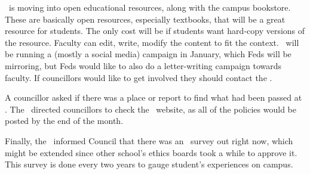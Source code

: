 \begin{information}
    \ousa\ is moving into open educational resources, along with the campus 
    bookstore. These are basically open resources, especially textbooks, that
    will be a great resource for students. The  only cost will be if students
    want hard-copy versions of the resource. Faculty can edit, write, modify 
    the content to fit the context. \ousa\ will be running a (mostly a social 
    media) campaign in January, which Feds will be mirroring, but Feds would 
    like to also do a letter-writing campaign towards faculty. If councillors
    would like to get involved they should contact the \vpe.

    A councillor asked if there was a place or report to find what had been 
    passed at \ousa. The \vped\ directed councillors to check the \ousa\ 
    website, as all of the policies would be posted by the end of the month.

    Finally, the \vped\ informed Council that there was an \ousa\ survey out 
    right now, which might be extended since other school's ethics boards took 
    a while to approve it. This survey is done every two years to gauge 
    student's experiences on campus. 

\end{information}

